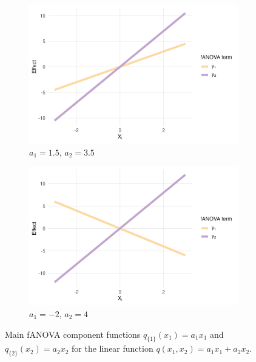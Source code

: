 \begin{figure}[htpb]
    \centering
    \begin{subfigure}[t]{0.49\textwidth}
        \centering
        \includegraphics[width=\textwidth]{images/experiment_section/linear_a1p15_a2p35_a11p00_a22p00_a12p00_rhop00_main.png}
        \caption{$a_1 = 1.5$, $a_2 = 3.5$}
    \end{subfigure}%
    \hfill
    \begin{subfigure}[t]{0.49\textwidth}
        \centering
        \includegraphics[width=\textwidth]{images/experiment_section/linear_a1m20_a2p40_a11p00_a22p00_a12p00_rhop00_main.png}
        \caption{$a_1 = -2$, $a_2 = 4$}
    \end{subfigure}
    \caption{Main fANOVA component functions $q_{\{1\}}(x_1) = a_1 x_1$ and $q_{\{2\}}(x_2) = a_2 x_2$ for the linear function $q(x_1,x_2)=a_1x_1+a_2x_2$.}
    \label{fig:linear_main_effects}
\end{figure}


